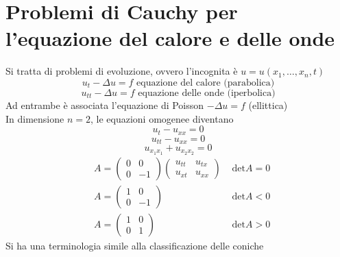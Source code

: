 
\section{Problemi di Cauchy per l'equazione del calore e delle onde}
Si tratta di problemi di evoluzione, ovvero l'incognita è $u=u(x_1,\ldots,x_{n},t)$ 
\[u_t-\Delta u = f \text{ equazione del calore (parabolica)}\]
\[u_{t t}-\Delta u = f \text{ equazione delle onde (iperbolica)}\]
Ad entrambe è associata l'equazione di Poisson $-\Delta u = f $ (ellittica)
\\In dimensione $n=2$, le equazioni omogenee diventano
\[u_t-u_{x x}=0\]
\[u_{t t}-u_{x x}=0\]
\[u_{x_1x_1}+u_{x_2x_2}=0\]
\begin{align*}
&A=\begin{pmatrix} 0&0\\0&-1 \end{pmatrix} \begin{pmatrix} u_{t t}&u_{tx}\\u_{x t}&u_{x x} \end{pmatrix} &\text{ det}A = 0\\
&A= \begin{pmatrix} 1&0\\0&-1 \end{pmatrix} &\text{ det}A<0\\
&A= \begin{pmatrix} 1 & 0\\0 & 1 \end{pmatrix} &\text{ det}A>0
\end{align*}
Si ha una terminologia simile alla classificazione delle coniche
